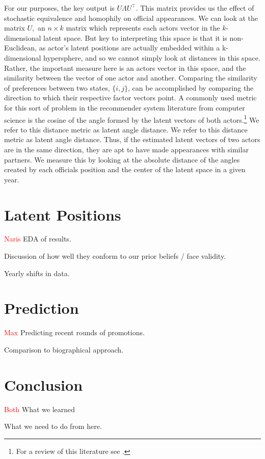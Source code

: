 \documentclass[12pt]{amsart}
\begin{document}
For our purposes, the key output is $U \Lambda U^{\top}$. This matrix provides us the effect of stochastic equivalence and homophily on official appearances. We can look at the matrix $U,$ an $n \times k$ matrix which represents each actors vector in the $k$-dimensional latent space. But key to interpreting this space is that it is non-Euclidean, as actor's latent positions are actually embedded within a k-dimensional hypersphere, and so we cannot simply look at distances in this space. Rather, the important measure here is an actors vector in this space, and the similarity between the vector of one actor and another.  Comparing the similarity of preferences between two states, $\{i,j\}$, can be accomplished by comparing the direction to which their respective factor vectors point. A commonly used metric for this sort of problem in the recommender system literature from computer science is the cosine of the angle formed by the latent vectors of both actors.\footnote{For a review of this literature see \citep{amatriain:etal:2015}.} We refer to this distance metric as latent angle distance. We refer to this distance metric as latent angle distance. Thus, if the estimated latent vectors of two actors are in the same direction, they are apt to have made appearances with similar partners. We measure this by looking at the absolute distance of the angles created by each officials position and the center of the latent space in a given year.

\section{Latent Positions}
\textcolor{red}{Naris}
EDA of results.

Discussion of how well they conform to our prior beliefs / face validity.

Yearly shifts in data.
\section{Prediction}
\textcolor{red}{Max}
Predicting recent rounds of promotions.

Comparison to biographical approach.
\section{Conclusion}
\textcolor{red}{Both}
What we learned

What we need to do from here.
\end{document}
